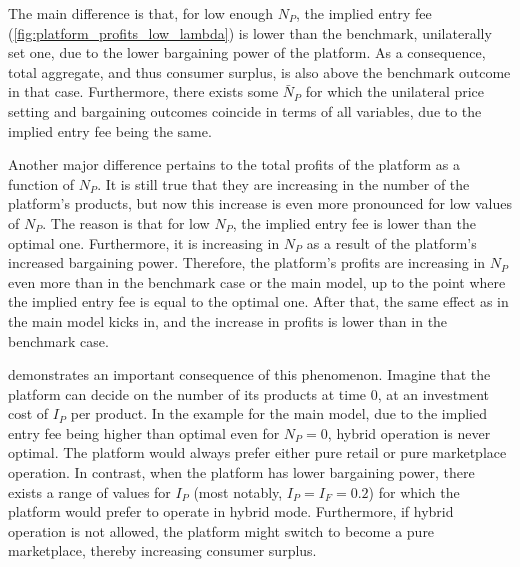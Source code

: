 \documentclass[a4paper]{article}
\begin{document}
The main difference is that, for low enough $N_P$, the implied entry fee (\cref{fig:platform_profits_low_lambda}) is lower than the benchmark, unilaterally set one,  due to the lower bargaining power of the platform.
As a consequence, total aggregate, and thus consumer surplus, is also above the benchmark outcome in that case.
Furthermore, there exists some $\bar{N}_P$ for which the unilateral price setting and bargaining outcomes coincide in terms of all variables, due to the implied entry fee being the same.

Another major difference pertains to the total profits of the platform as a function of $N_P$.
It is still true that they are increasing in the number of the platform's products, but now this increase is even more pronounced for low values of $N_P$.
The reason is that for low $N_P$, the implied entry fee is lower than the optimal one.
Furthermore, it is increasing in $N_P$ as a result of the platform's increased bargaining power.
Therefore, the platform's profits are increasing in $N_P$ even more than in the benchmark case or the main model, up to the point where the implied entry fee is equal to the optimal one.
After that, the same effect as in the main model kicks in, and the increase in profits is lower than in the benchmark case.

 demonstrates an important consequence of this phenomenon.
Imagine that the platform can decide on the number of its products at time 0, at an investment cost of $I_P$ per product.
In the example for the main model, due to the implied entry fee being higher than optimal even for $N_P = 0$, hybrid operation is never optimal.
The platform would always prefer either pure retail or pure marketplace operation.
In contrast, when the platform has lower bargaining power, there exists a range of values for $I_P$ (most notably, $I_P = I_F = 0.2$) for which the platform would prefer to operate in hybrid mode.
Furthermore, if hybrid operation is not allowed, the platform might switch to become a pure marketplace, thereby increasing consumer surplus.
\end{document}
